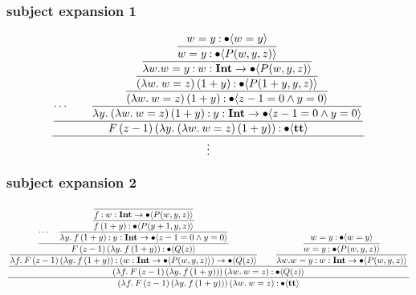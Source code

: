 \documentclass{article}
\begin{document}
\subsubsection{subject expansion 1}

\begin{equation*}
    \dfrac{
    \dfrac{
        \cdots
        \qquad
        \dfrac{
            \dfrac{
                \dfrac{
                    \dfrac{
                        \dfrac{
                            w = y \mathbin{:} \bullet \langle  w = y \rangle
                        }{
                            w = y \mathbin{:} \bullet \langle P(w, y, z) \rangle
                        }
                    }{
                        \lambda w. w = y \mathbin{:} {w} : \textbf{Int} \to \bullet \langle P(w, y, z) \rangle
                    }
                }{
                    (\lambda w.\: w = z)\,(1+y) \mathbin{:} \bullet \langle P(1+y, y, z) \rangle
                }
            }{
                (\lambda w.\: w = z)\,(1+y) \mathbin{:} \bullet \langle z-1 = 0 \wedge y = 0 \rangle
            }
        }{
            \lambda y.\: (\lambda w.\: w = z)\,(1+y) \mathbin{:} {y} : \textbf{Int} \to \bullet \langle z-1 = 0 \wedge y = 0 \rangle
        }
    }{
        F\, (z-1) \,(\lambda y.\: (\lambda w.\: w = z)\,(1+y)) \mathbin{:} \bullet \langle \textbf{tt} \rangle
    }
    }{\vdots}
\end{equation*}

\subsubsection{subject expansion 2}

\begin{equation*}
    \dfrac{
        \dfrac{
            \dfrac{
                \dfrac{
                    \cdots
                    \quad
                    \dfrac{
                        \dfrac{
                            \dfrac{}{
                                f \mathbin{:} {w} : \textbf{Int} \to \bullet \langle P(w, y, z) \rangle
                            }
                        }{
                            f\,(1+y) \mathbin{:} \bullet \langle P(y+1, y, z) \rangle
                        }
                    } {
                        \lambda y.\: f\,(1+y) \mathbin{:} {y} : \textbf{Int} \to \bullet \langle z - 1 = 0 \wedge y = 0 \rangle
                    }
                }{
                    F\, (z-1)\, (\lambda y.\: f\,(1+y))  \mathbin{:} \bullet \langle Q(z) \rangle
                }
            }{
                \lambda f.\: F\, (z-1)\, (\lambda y.\: f\,(1+y)) \mathbin{:} ({w} : \textbf{Int} \to \bullet \langle P(w, y, z) \rangle) \to \bullet \langle Q(z) \rangle
            }
            \qquad 
            \dfrac{
                \dfrac{
                    w = y \mathbin{:} \bullet \langle  w = y \rangle
                }{
                    w = y \mathbin{:} \bullet \langle P(w, y, z) \rangle
                }
            }{
                \lambda w. w = y \mathbin{:} {w} : \textbf{Int} \to \bullet \langle P(w, y, z) \rangle
            }
        }{
            (\lambda f.\: F\, (z-1)\, (\lambda y.\: f\,(1+y)))\, (\lambda w.\: w = z) \mathbin{:} \bullet \langle Q(z) \rangle
        }
    }{
        (\lambda f.\: F\, (z-1)\, (\lambda y.\: f\,(1+y)))\, (\lambda w.\: w = z) \mathbin{:} \bullet \langle \textbf{tt} \rangle
    }
\end{equation*}
\end{document}
